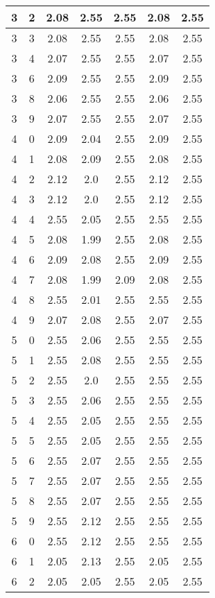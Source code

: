 \begin{longtable}{|c|c||c||c|c||c|c|}
	3 & 2 & 2.08 & 2.55 & 2.55 & 2.08 & 2.55 \\ \hline
	3 & 3 & 2.08 & 2.55 & 2.55 & 2.08 & 2.55 \\ \hline
	3 & 4 & 2.07 & 2.55 & 2.55 & 2.07 & 2.55 \\ \hline
	3 & 6 & 2.09 & 2.55 & 2.55 & 2.09 & 2.55 \\ \hline
	3 & 8 & 2.06 & 2.55 & 2.55 & 2.06 & 2.55 \\ \hline
	3 & 9 & 2.07 & 2.55 & 2.55 & 2.07 & 2.55 \\ \hline
	4 & 0 & 2.09 & 2.04 & 2.55 & 2.09 & 2.55 \\ \hline
	4 & 1 & 2.08 & 2.09 & 2.55 & 2.08 & 2.55 \\ \hline
	4 & 2 & 2.12 & 2.0 & 2.55 & 2.12 & 2.55 \\ \hline
	4 & 3 & 2.12 & 2.0 & 2.55 & 2.12 & 2.55 \\ \hline
	4 & 4 & 2.55 & 2.05 & 2.55 & 2.55 & 2.55 \\ \hline
	4 & 5 & 2.08 & 1.99 & 2.55 & 2.08 & 2.55 \\ \hline
	4 & 6 & 2.09 & 2.08 & 2.55 & 2.09 & 2.55 \\ \hline
	4 & 7 & 2.08 & 1.99 & 2.09 & 2.08 & 2.55 \\ \hline
	4 & 8 & 2.55 & 2.01 & 2.55 & 2.55 & 2.55 \\ \hline
	4 & 9 & 2.07 & 2.08 & 2.55 & 2.07 & 2.55 \\ \hline
	5 & 0 & 2.55 & 2.06 & 2.55 & 2.55 & 2.55 \\ \hline
	5 & 1 & 2.55 & 2.08 & 2.55 & 2.55 & 2.55 \\ \hline
	5 & 2 & 2.55 & 2.0 & 2.55 & 2.55 & 2.55 \\ \hline
	5 & 3 & 2.55 & 2.06 & 2.55 & 2.55 & 2.55 \\ \hline
	5 & 4 & 2.55 & 2.05 & 2.55 & 2.55 & 2.55 \\ \hline
	5 & 5 & 2.55 & 2.05 & 2.55 & 2.55 & 2.55 \\ \hline
	5 & 6 & 2.55 & 2.07 & 2.55 & 2.55 & 2.55 \\ \hline
	5 & 7 & 2.55 & 2.07 & 2.55 & 2.55 & 2.55 \\ \hline
	5 & 8 & 2.55 & 2.07 & 2.55 & 2.55 & 2.55 \\ \hline
	5 & 9 & 2.55 & 2.12 & 2.55 & 2.55 & 2.55 \\ \hline
	6 & 0 & 2.55 & 2.12 & 2.55 & 2.55 & 2.55 \\ \hline
	6 & 1 & 2.05 & 2.13 & 2.55 & 2.05 & 2.55 \\ \hline
	6 & 2 & 2.05 & 2.05 & 2.55 & 2.05 & 2.55 \\ \hline

\end{longtable}
